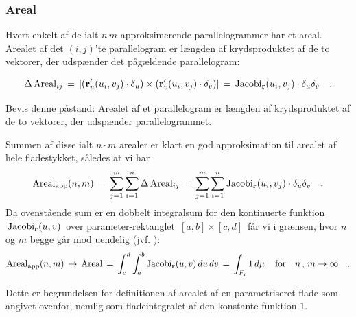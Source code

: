 \subsubsection{Areal}\label{subsubsecAreal}
Hvert enkelt af de ialt $n\,m$ approksimerende
parallelogrammer har et areal. Arealet af det
$(i, j)$'te parallelogram er længden af
krydsproduktet af de to vektorer, der udspænder
det pågældende parallelogram:

\begin{equation}
\Delta \operatorname{Areal}_{ij} \, = \,  | ({\bf r}'_{u}(u_{i}, v_{j})\cdot
\delta_{u})\times ({\bf r}'_{v}(u_{i}, v_{j})\cdot \delta_{v}) |  \,
= \, \operatorname{Jacobi}_{\bf r}(u_{i}, v_{j})\cdot \delta_{u}\delta_{v} \quad.
\end{equation}



\begin{exercise}
Bevis denne påstand: Arealet af et parallelogram
er længden af krydsproduktet af de to vektorer,
der udspænder parallelogrammet.
\end{exercise}


Summen af disse ialt $n\cdot m$ arealer er klart en god approksimation
til arealet af hele fladestykket, således at vi har
\begin{equation}
\operatorname{Areal}_{\operatorname{app}}(n,m)\, = \,   \sum_{j=1}^{m}\sum_{i=1}^{n} \Delta \operatorname{Areal}_{ij}
\, = \,  \sum_{j=1}^{m}\sum_{i=1}^{n} \operatorname{Jacobi}_{\bf r}(u_{i},
v_{j})\cdot \delta_{u} \delta_{v}  \quad.
\end{equation}
Da ovenstående sum er en dobbelt integralsum for den kontinuerte
funktion $\, \operatorname{Jacobi}_{\bf r}(u, v)\, $ over parameter-rektanglet $\,
[a, b]\times[c, d]\, $ får vi i grænsen, hvor $n$ og $m$ begge går
mod uendelig (jvf. ):
\begin{equation}
\operatorname{Areal}_{\operatorname{app}}(n,m)\,  \to \, \operatorname{Areal}\, = \, \int_{c}^{d} \int_{a}^{b}
\operatorname{Jacobi}_{\bf r}(u, v) \,du \, dv \, = \, \int_{F_{\bf r}} 1 \, d\mu \, \quad \text{for} \quad n\, , \, m  \to
\infty \quad.
\end{equation}

Dette er begrundelsen for definitionen af arealet af en
parametriseret flade som angivet ovenfor, nemlig som
fladeintegralet af den konstante funktion $1$.



